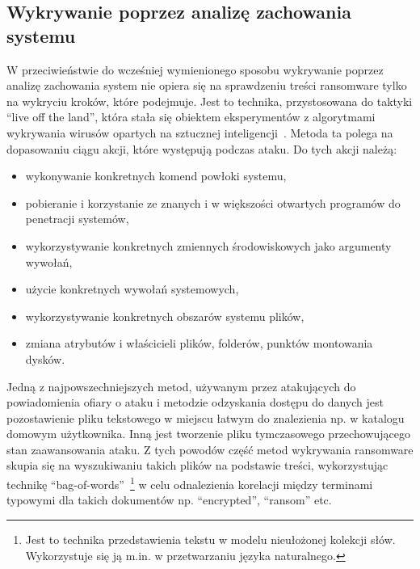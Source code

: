 \subsection{Wykrywanie poprzez analizę zachowania systemu}
W przeciwieństwie do wcześniej wymienionego sposobu wykrywanie poprzez analizę zachowania system nie opiera się na sprawdzeniu treści ransomware tylko na wykryciu kroków, które podejmuje. Jest to technika, przystosowana do taktyki \foreignquote{english}{live off the land}, która stała się obiektem eksperymentów z algorytmami wykrywania wirusów opartych na sztucznej inteligencji~\cite{vehabovic_ransomware_2022}. Metoda ta polega na dopasowaniu ciągu akcji, które występują podczas ataku. Do tych akcji należą:
\begin{itemize}
    \item wykonywanie konkretnych komend powłoki systemu,
    \item pobieranie i korzystanie ze znanych i w większości otwartych programów do penetracji systemów,
    \item wykorzystywanie konkretnych zmiennych środowiskowych jako argumenty wywołań,
    \item użycie konkretnych wywołań systemowych,
    \item wykorzystywanie konkretnych obszarów systemu plików,
    \item zmiana atrybutów i właścicieli plików, folderów, punktów montowania dysków.
\end{itemize}
Jedną z najpowszechniejszych metod, używanym przez atakujących do powiadomienia ofiary o ataku i metodzie odzyskania dostępu do danych jest pozostawienie pliku tekstowego w miejscu łatwym do znalezienia np. w katalogu domowym użytkownika. Inną jest tworzenie pliku tymczasowego przechowującego stan zaawansowania ataku. Z tych powodów część metod wykrywania ransomware skupia się na wyszukiwaniu takich plików na podstawie treści, wykorzystując technikę \foreignquote{english}{bag-of-words}~\footnote{Jest to technika przedstawienia tekstu w modelu nieułożonej kolekcji słów. Wykorzystuje się ją m.in. w przetwarzaniu języka naturalnego.} w celu odnalezienia korelacji między terminami typowymi dla takich dokumentów np. \foreignquote{english}{encrypted}, \foreignquote{english}{ransom} etc.
